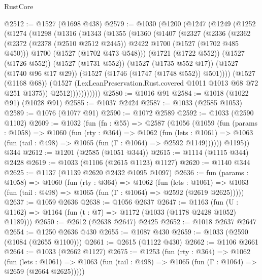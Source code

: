 \begin{lexlean}{RustCore}
\begin{coremodule}
@2512 := @1527 (@1698 @438)
@2579 := @1030
    (@1200
      (@1247
        (@1249
          (@1252
            (@1274
              (@1298
                (@1316
                  (@1343
                    (@1355
                      (@1360
                        (@1407
                          (@2327
                            (@2336
                              (@2362
                                (@2372
                                  (@2378 (@2510 @2512 @2445))
                                  @2422
                                  @1700
                                  (@1527 (@1702 @485 @450)))
                                @1700
                                (@1527 (@1702 @473 @548)))
                              (@1721 (@1722 @552))
                              (@1527 (@1726 @552))
                              (@1527 (@1731 @552))
                              (@1527 (@1735 @552 @17))
                              (@1527 (@1740 @96 @17 @29))
                              (@1527 (@1746 (@1747 (@1748 @552)) @501))))
                          (@1527 (@1168 @68))
                          (@1527 (LexLeanPreservation.Rust.covered @1011 @1013 @68 @72 @251 @1375))
                          @2512)))))))))))
@2580 := @1016 @91
@2584 := @1018 (@1022 @91) (@1028 @91)
@2585 := @1037 @2424
@2587 := @1033 (@2585 @1053)
@2589 := @1076 (@1077 @91)
@2590 := @1072 @2589
@2592 := @1033 (@2590 @1102)
@2609 := @1032
    (fun (fn : @55) =>
    @2587
      (@1056
        (@1059
          (fun (params : @1058) =>
          @1060
            (fun (rty : @364) =>
            @1062
              (fun (lets : @1061) =>
              @1063 (fun (tail : @498) => @1065 (fun (Γ : @1064) => @2592 @1149))))))
        @1195))
    @344
@2612 := @1201 (@2585 (@1051 @344))
@2615 := @1114 (@1115 @344) @2428
@2619 := @1033 (@1106 (@2615 @1123) @1127)
@2620 := @1140 @344
@2625 := @1137 (@1139 @2620 @2432 @1095 @1097)
@2636 := fun (params : @1058) =>
  @1060
    (fun (rty : @364) =>
    @1062
      (fun (lets : @1061) =>
      @1063 (fun (tail : @498) => @1065 (fun (Γ : @1064) => @2592 (@2619 @2625)))))
@2637 := @1059 @2636
@2638 := @1056 @2637
@2647 := @1163 (fun (U : @1162) => @1164 (fun (t : @7) => @1172 (@1033 (@1178 @2428 @1052) @1189)))
@2650 := @2612 (@2638 @2647) @2425
@2652 := @1018 @2637 @2647
@2654 := @1250 @2636 @430
@2655 := @1087 @430
@2659 := @1033 (@2590 (@1084 (@2655 @1100)))
@2661 := @2615 (@1122 @430)
@2662 := @1106 @2661
@2664 := @1033 (@2662 @1127)
@2675 := @1253
    (fun (rty : @364) =>
    @1062
      (fun (lets : @1061) =>
      @1063 (fun (tail : @498) => @1065 (fun (Γ : @1064) => @2659 (@2664 @2625)))))

\end{coremodule}
\end{lexlean}
